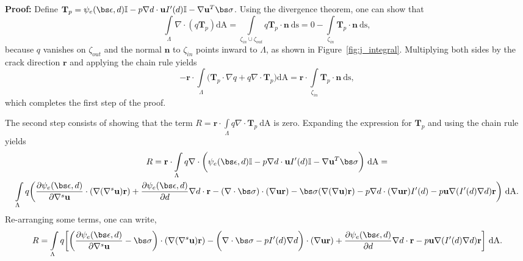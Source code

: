 \medskip

\noindent \textbf{Proof:} Define $\textbf{T}_p = \psi_e(\bs\epsilon, d)\mathbb{I} -p\nabla d\cdot\textbf{u}I'(d)\mathbb{I}  - \nabla \textbf{u}^T\bs \sigma$. Using the divergence theorem, one can show that
\begin{equation}
    \int\limits_{\Lambda} \nabla\cdot(q\textbf{T}_p)\text{dA} = \int\limits_{\zeta_{in}\cup\zeta_{out}}q\textbf{T}_p\cdot\textbf{n}\ \text{ds} = 0 - \int\limits_{\zeta_{in}}\textbf{T}_p\cdot\textbf{n}\ \text{ds}, 
\end{equation}
because $q$ vanishes on $\zeta_{out}$ and the normal $\textbf{n}$ to $\zeta_{in}$ points inward to $\Lambda$, as shown in Figure~\ref{fig:j_integral}.  
Multiplying both sides by the crack direction $\textbf{r}$ and applying the chain rule yields
\begin{equation}\label{first_step}
    -\textbf{r}\cdot\int\limits_{\Lambda} \biggl( \textbf{T}_p\cdot \nabla q + q\nabla \cdot \textbf{T}_p\biggr)\text{dA} =  \textbf{r}\cdot\int\limits_{\zeta_{in}}\textbf{T}_p\cdot\textbf{n}\ \text{ds}, 
\end{equation}
 which completes the first step of the proof. 
 
 The second step consists of showing that the term $R = \textbf{r}\cdot\int\limits_{\Lambda} q\nabla \cdot \textbf{T}_p\ \text{dA}$ is zero. Expanding the expression for $\textbf{T}_p$ and using the chain rule yields
\begin{multline}
    R = \textbf{r}\cdot\int\limits_{\Lambda} q\nabla \cdot \biggl( \psi_e(\bs\epsilon, d)\mathbb{I} -p\nabla d\cdot\textbf{u}I'(d)\mathbb{I}  - \nabla \textbf{u}^T\bs\sigma \biggr)\ \text{dA} = \\
    \int\limits_{\Lambda} q\biggl( \dfrac{\partial \psi_e(\bs\epsilon, d)}{\partial\nabla^s\textbf{u}}\cdot(\nabla(\nabla^s\textbf{u})\textbf{r}) + \dfrac{\partial \psi_e(\bs\epsilon, d)}{\partial d}\nabla d\cdot \textbf{r} 
    - (\nabla \cdot \bs\sigma)\cdot(\nabla\textbf{u}\textbf{r}) - \bs\sigma(\nabla (\nabla\textbf{u})\textbf{r})-p\nabla d\cdot(\nabla \textbf{u}\textbf{r})I'(d) - p\textbf{u}\nabla(I'(d)\nabla d)\textbf{r} \biggr)\ \text{dA}.
\end{multline}
 Re-arranging some terms, one can write,
\begin{equation}
    R = \int\limits_{\Lambda} q\biggl[\biggl( \dfrac{\partial \psi_e(\bs\epsilon, d)}{\partial\nabla^s\textbf{u}}-\bs\sigma\biggr) \cdot(\nabla(\nabla^s\textbf{u})\textbf{r}) 
    -\biggl( \nabla \cdot \bs\sigma - pI'(d) \nabla d \biggr)\cdot (\nabla\textbf{u}\textbf{r})
    + \dfrac{\partial \psi_e(\bs\epsilon, d)}{\partial d}\nabla d\cdot \textbf{r} 
    - p\textbf{u}\nabla(I'(d)\nabla d)\textbf{r} \biggr]\ \text{dA}.
\end{equation}

